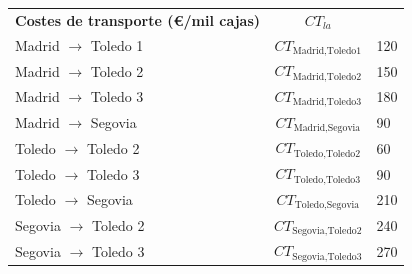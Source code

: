 \begin{table}[!h]
\begin{tabular}{lcl}
\midrule
\textbf{Costes de transporte (€/mil cajas)} & $CT_{la}$ & \\
\quad Madrid $\rightarrow$ Toledo 1 & $CT_{\text{Madrid,Toledo1}}$ & 120 \\
\quad Madrid $\rightarrow$ Toledo 2 & $CT_{\text{Madrid,Toledo2}}$ & 150 \\
\quad Madrid $\rightarrow$ Toledo 3 & $CT_{\text{Madrid,Toledo3}}$ & 180 \\
\quad Madrid $\rightarrow$ Segovia & $CT_{\text{Madrid,Segovia}}$ & 90 \\
\quad Toledo $\rightarrow$ Toledo 2 & $CT_{\text{Toledo,Toledo2}}$ & 60 \\
\quad Toledo $\rightarrow$ Toledo 3 & $CT_{\text{Toledo,Toledo3}}$ & 90 \\
\quad Toledo $\rightarrow$ Segovia & $CT_{\text{Toledo,Segovia}}$ & 210 \\
\quad Segovia $\rightarrow$ Toledo 2 & $CT_{\text{Segovia,Toledo2}}$ & 240 \\
\quad Segovia $\rightarrow$ Toledo 3 & $CT_{\text{Segovia,Toledo3}}$ & 270 \\
\bottomrule
\end{tabular}
\end{table}









